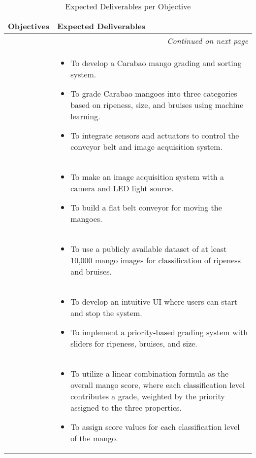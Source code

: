 \begin{center}
	{\scriptsize
		\begin{longtable}{p{}|p{}}
			\caption{Expected Deliverables per Objective} \label{tab:expected_deliverables} \\
			\hline 
			\hline 
			\textbf{Objectives} & 
			\textbf{Expected Deliverables} \\ 
			\hline 
			\endhead
			\hline 
			\multicolumn{2}{r}{\textit{Continued on next page}} \\ 
			\endfoot
			\hline 
			\endlastfoot
			\hline
			\Paste{GO} & \begin{itemize}
				\item To develop a Carabao mango grading and sorting system.
				\item To grade Carabao mangoes into three categories based on ripeness, size, and 
				bruises using machine learning.
				\item To integrate sensors and actuators to control the conveyor belt and image acquisition system.
			\end{itemize} \\ \hline
			
			\Paste{SO1} & \begin{itemize}
				\item To make an image acquisition system with a camera and LED light source.
				\item To build a flat belt conveyor for moving the mangoes.
			\end{itemize} \\ \hline
			
			\Paste{SO2} & \begin{itemize}
				\item To use a publicly available dataset of at least 10,000 mango images
				for classification of ripeness and bruises.
			\end{itemize} \\ \hline
			
			\Paste{SO3} & \begin{itemize}
				\item To develop an intuitive UI where users can start and stop the system.
				\item To implement a priority-based grading system with sliders for ripeness, bruises, and size.
			\end{itemize} \\ \hline
			
			\Paste{SO4} & \begin{itemize}
				\item To utilize a linear combination formula as the overall mango score, where each classification level 
				contributes a grade, weighted by the priority assigned to the three properties.
				\item To assign score values for each classification level of the mango.
			\end{itemize} \\ \hline
			

\end{longtable}}
\end{center}
